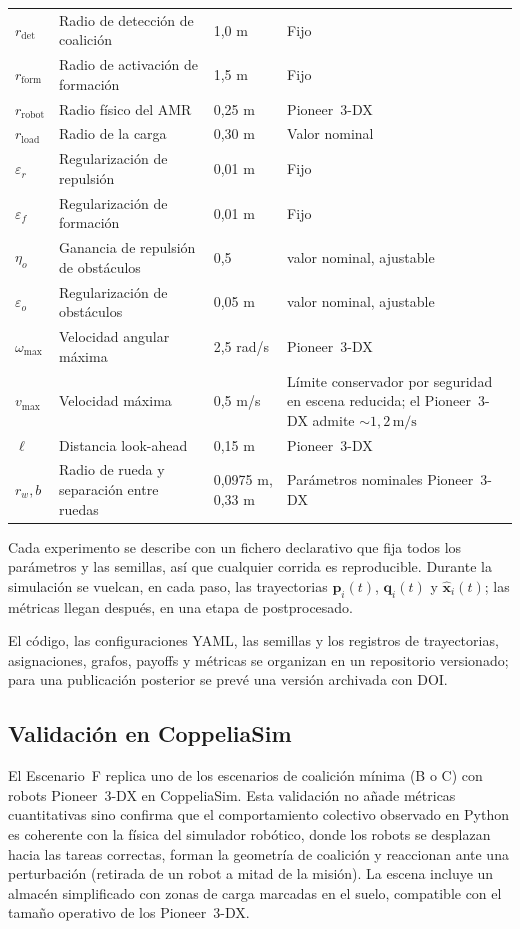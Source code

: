 \begin{table}[htbp]
\begin{tabularx}{\textwidth}{>{\ttfamily}p{}p{}p{}Y}
$r_{\mathrm{det}}$ & Radio de detección de coalición & 1{,}0 m & Fijo \\
$r_{\mathrm{form}}$ & Radio de activación de formación & 1{,}5 m & Fijo \\
$r_{\mathrm{robot}}$ & Radio físico del AMR & 0{,}25 m & Pioneer~3-DX \\
$r_{\mathrm{load}}$ & Radio de la carga & 0{,}30 m & Valor nominal \\
$\varepsilon_r$ & Regularización de repulsión & 0{,}01 m & Fijo \\
$\varepsilon_f$ & Regularización de formación & 0{,}01 m & Fijo \\
$\eta_o$ & Ganancia de repulsión de obstáculos & 0{,}5 & valor nominal, ajustable \\
$\varepsilon_o$ & Regularización de obstáculos & 0{,}05 m & valor nominal, ajustable \\
$\omega_{\max}$ & Velocidad angular máxima & 2{,}5 rad/s & Pioneer~3-DX \\
$v_{\max}$ & Velocidad máxima & 0{,}5 m/s & Límite conservador por seguridad en escena reducida; el Pioneer~3-DX admite ${\sim}1{,}2\,\text{m/s}$ \\
$\ell$ & Distancia look-ahead & 0{,}15 m & Pioneer~3-DX \\
$r_w,b$ & Radio de rueda y separación entre ruedas & 0{,}0975 m, 0{,}33 m & Parámetros nominales Pioneer~3-DX \\
\bottomrule
\end{tabularx}
\end{table}

Cada experimento se describe con un fichero declarativo que fija todos los parámetros
y las semillas, así que cualquier corrida es reproducible. Durante la simulación se
vuelcan, en cada paso, las trayectorias $\mathbf{p}_i(t)$, $\mathbf{q}_i(t)$ y
$\hat{\mathbf{x}}_i(t)$; las métricas llegan después, en una etapa de postprocesado.

El código, las configuraciones YAML, las semillas y los registros de trayectorias,
asignaciones, grafos, payoffs y métricas se organizan en un repositorio versionado;
para una publicación posterior se prevé una versión archivada con DOI.

\subsection{Validación en CoppeliaSim}

El Escenario~F replica uno de los escenarios de coalición mínima (B o C) con
robots Pioneer~3-DX en CoppeliaSim. Esta validación no añade métricas cuantitativas sino
confirma que el comportamiento colectivo observado en Python es coherente con la
física del simulador robótico, donde los robots se desplazan hacia las tareas correctas,
forman la geometría de coalición y reaccionan ante una perturbación (retirada de un
robot a mitad de la misión). La escena incluye un almacén simplificado con zonas de
carga marcadas en el suelo, compatible con el tamaño operativo de los Pioneer~3-DX.

